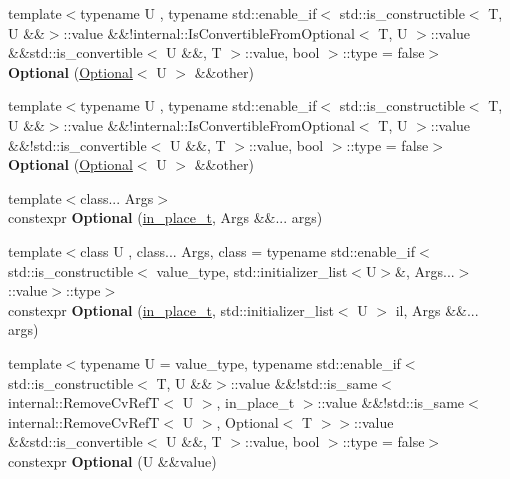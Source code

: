 \begin{DoxyCompactItemize}
{\footnotesize template$<$typename U , typename std\+::enable\+\_\+if$<$ std\+::is\+\_\+constructible$<$ T, U \&\&$>$\+::value \&\&!internal\+::\+Is\+Convertible\+From\+Optional$<$ T, U $>$\+::value \&\&std\+::is\+\_\+convertible$<$ U \&\&, T $>$\+::value, bool $>$\+::type  = false$>$ }\\{\bfseries Optional} (\mbox{\hyperlink{classv8_1_1base_1_1Optional}{Optional}}$<$ U $>$ \&\&other)
\item 
\mbox{\label{classv8_1_1base_1_1Optional_a2db7ed6a130655410a1ef7f05124587a}} 
{\footnotesize template$<$typename U , typename std\+::enable\+\_\+if$<$ std\+::is\+\_\+constructible$<$ T, U \&\&$>$\+::value \&\&!internal\+::\+Is\+Convertible\+From\+Optional$<$ T, U $>$\+::value \&\&!std\+::is\+\_\+convertible$<$ U \&\&, T $>$\+::value, bool $>$\+::type  = false$>$ }\\{\bfseries Optional} (\mbox{\hyperlink{classv8_1_1base_1_1Optional}{Optional}}$<$ U $>$ \&\&other)
\item 
\mbox{\label{classv8_1_1base_1_1Optional_a8cd6bd1d90188a45831c33d1b51a78ef}} 
{\footnotesize template$<$class... Args$>$ }\\constexpr {\bfseries Optional} (\mbox{\hyperlink{structv8_1_1base_1_1in__place__t}{in\+\_\+place\+\_\+t}}, Args \&\&... args)
\item 
\mbox{\label{classv8_1_1base_1_1Optional_ac49de9aad99c47cfaa74787c7da8ba73}} 
{\footnotesize template$<$class U , class... Args, class  = typename std\+::enable\+\_\+if$<$std\+::is\+\_\+constructible$<$                value\+\_\+type, std\+::initializer\+\_\+list$<$\+U$>$\&, Args...$>$\+::value$>$\+::type$>$ }\\constexpr {\bfseries Optional} (\mbox{\hyperlink{structv8_1_1base_1_1in__place__t}{in\+\_\+place\+\_\+t}}, std\+::initializer\+\_\+list$<$ U $>$ il, Args \&\&... args)
\item 
\mbox{\label{classv8_1_1base_1_1Optional_a12b49e09d8dcf8bfad0c10472731e6b3}} 
{\footnotesize template$<$typename U  = value\+\_\+type, typename std\+::enable\+\_\+if$<$ std\+::is\+\_\+constructible$<$ T, U \&\&$>$\+::value \&\&!std\+::is\+\_\+same$<$ internal\+::\+Remove\+Cv\+Ref\+T$<$ U $>$, in\+\_\+place\+\_\+t $>$\+::value \&\&!std\+::is\+\_\+same$<$ internal\+::\+Remove\+Cv\+Ref\+T$<$ U $>$, Optional$<$ T $>$$>$\+::value \&\&std\+::is\+\_\+convertible$<$ U \&\&, T $>$\+::value, bool $>$\+::type  = false$>$ }\\constexpr {\bfseries Optional} (U \&\&value)

\end{DoxyCompactItemize}
